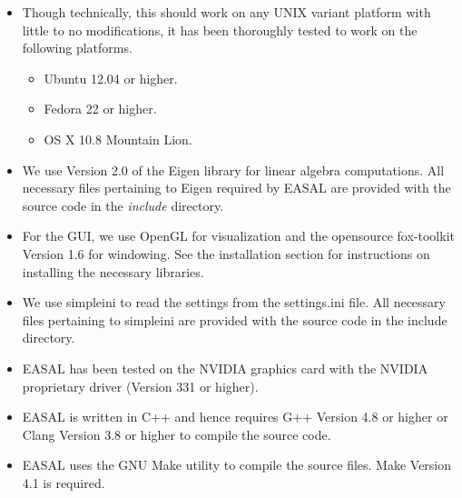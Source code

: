 \documentclass[10pt]{article}
\begin{document}
\begin{itemize} 
  \item Though technically, this should work on any UNIX variant platform with little to no modifications, it has been thoroughly tested to work on the following platforms. 
  \begin{itemize}
	\item Ubuntu 12.04 or higher.
	\item Fedora 22 or higher.
	\item OS X 10.8 Mountain Lion.
\end{itemize}
  \item We use Version 2.0 of the Eigen library for linear algebra
		  computations. All necessary files pertaining to Eigen required by
		  EASAL are provided with the source code in the \emph{include}
		  directory.  
   
   \item For the GUI, we use OpenGL for visualization and the
		  opensource fox-toolkit Version 1.6 for windowing. See the
		  installation section for instructions on installing the necessary
		  libraries.  
		  
   \item We use simpleini to read the settings from the
		  settings.ini file. All necessary files pertaining to simpleini are
		  provided with the source code in the include directory.
   
   \item EASAL has been tested on the NVIDIA graphics card with the NVIDIA
		  proprietary driver (Version 331 or higher).  \item EASAL is written
		  in C++ and hence requires G++ Version 4.8 or higher or Clang Version 3.8 or 
		  higher to compile the source code. 
		  
  \item EASAL uses the GNU Make utility to compile the source files. Make
		  Version 4.1 is required.
\end{itemize}

 
\end{document}
